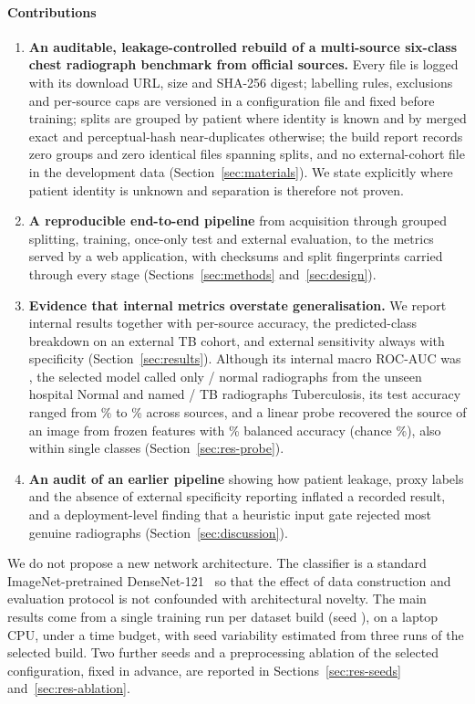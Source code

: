 \paragraph{Contributions}
\begin{enumerate}
\item \textbf{An auditable, leakage-controlled rebuild of a multi-source six-class chest radiograph benchmark from official sources.} Every file is logged with its download URL, size and SHA-256 digest; labelling rules, exclusions and per-source caps are versioned in a configuration file and fixed before training; splits are grouped by patient where identity is known and by merged exact and perceptual-hash near-duplicates otherwise; the build report records zero groups and zero identical files spanning splits, and no external-cohort file in the development data (Section~\ref{sec:materials}). We state explicitly where patient identity is unknown and separation is therefore not proven.
\item \textbf{A reproducible end-to-end pipeline} from acquisition through grouped splitting, training, once-only test and external evaluation, to the metrics served by a web application, with checksums and split fingerprints carried through every stage (Sections~\ref{sec:methods} and~\ref{sec:design}).
\item \textbf{Evidence that internal metrics overstate generalisation.} We report internal results together with per-source accuracy, the predicted-class breakdown on an external TB cohort, and external sensitivity always with specificity (Section~\ref{sec:results}). Although its internal macro ROC-AUC was \RTestMacroAUC, the selected model called only \RExtSpecK/\RExtSpecN{} normal radiographs from the unseen hospital Normal and named \RExtTBK/\RExtTBN{} TB radiographs Tuberculosis, its test accuracy ranged from \RSrcAccCohen\% to \RSrcAccCovidRad\% across sources, and a linear probe recovered the source of an image from frozen features with \RProbeImgBalAcc\% balanced accuracy (chance \RProbeImgChance\%), also within single classes (Section~\ref{sec:res-probe}).
\item \textbf{An audit of an earlier pipeline} showing how patient leakage, proxy labels and the absence of external specificity reporting inflated a recorded result, and a deployment-level finding that a heuristic input gate rejected most genuine radiographs (Section~\ref{sec:discussion}).
\end{enumerate}

We do not propose a new network architecture. The classifier is a standard ImageNet-pretrained DenseNet-121~\cite{huang2017densely,deng2009imagenet} so that the effect of data construction and evaluation protocol is not confounded with architectural novelty. The main results come from a single training run per dataset build (seed \RSeed), on a laptop CPU, under a time budget, with seed variability estimated from three runs of the selected build. Two further seeds and a preprocessing ablation of the selected configuration, fixed in advance, are reported in Sections~\ref{sec:res-seeds} and~\ref{sec:res-ablation}.

